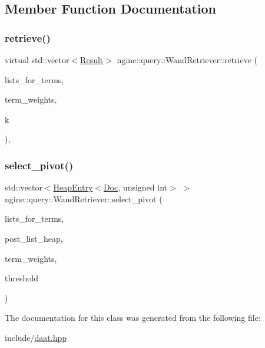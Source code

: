 \subsection{Member Function Documentation}
\mbox{\label{classngine_1_1query_1_1WandRetriever_a1b8157254522c8897cb174bf0b893b88}} 
\subsubsection{\texorpdfstring{retrieve()}{retrieve()}}
{\footnotesize\ttfamily virtual std\+::vector$<$\hyperlink{structngine_1_1query_1_1Result}{Result}$>$ ngine\+::query\+::\+Wand\+Retriever\+::retrieve (\begin{DoxyParamCaption}\item[{std\+::vector$<$ \hyperlink{classngine_1_1PostingList}{Posting\+List} $>$ \&}]{lists\+\_\+for\+\_\+terms,  }\item[{const std\+::vector$<$ \hyperlink{structngine_1_1Score}{Score} $>$ \&}]{term\+\_\+weights,  }\item[{const std\+::size\+\_\+t}]{k }\end{DoxyParamCaption})\hspace{0.3cm}{\ttfamily [inline]}, {\ttfamily [virtual]}}

\mbox{\label{classngine_1_1query_1_1WandRetriever_ac7651d23a4ba30e2399c5ecfa2a48b67}} 
\subsubsection{\texorpdfstring{select\+\_\+pivot()}{select\_pivot()}}
{\footnotesize\ttfamily std\+::vector$<$\hyperlink{structngine_1_1HeapEntry}{Heap\+Entry}$<$\hyperlink{structngine_1_1Doc}{Doc}, unsigned int$>$ $>$ ngine\+::query\+::\+Wand\+Retriever\+::select\+\_\+pivot (\begin{DoxyParamCaption}\item[{const std\+::vector$<$ \hyperlink{classngine_1_1PostingList}{Posting\+List} $>$ \&}]{lists\+\_\+for\+\_\+terms,  }\item[{\hyperlink{classngine_1_1MinHeap}{Min\+Heap}$<$ \hyperlink{structngine_1_1Doc}{Doc}, unsigned int $>$ \&}]{post\+\_\+list\+\_\+heap,  }\item[{const std\+::vector$<$ \hyperlink{structngine_1_1Score}{Score} $>$ \&}]{term\+\_\+weights,  }\item[{const \hyperlink{structngine_1_1Score}{Score}}]{threshold }\end{DoxyParamCaption})\hspace{0.3cm}{\ttfamily [inline]}}



The documentation for this class was generated from the following file\+:\begin{DoxyCompactItemize}
\item 
include/\hyperlink{daat_8hpp}{daat.\+hpp}\end{DoxyCompactItemize}
